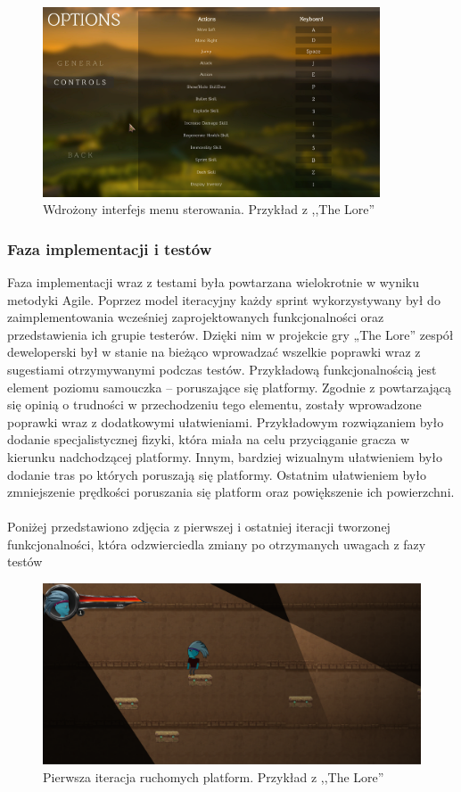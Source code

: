 \documentclass[oneside,polski,logo]{amuthesis}
\begin{document}
\begin{figure}[h]
	\centering
	\includegraphics[width=10cm]{images/hyps/of2.png}
	\caption{Wdrożony interfejs menu sterowania. Przykład z ,,The Lore''}
\end{figure}

\subsubsection{Faza implementacji i testów}

Faza implementacji wraz z testami była powtarzana wielokrotnie w wyniku metodyki Agile. Poprzez model iteracyjny każdy sprint wykorzystywany był do zaimplementowania wcześniej zaprojektowanych funkcjonalności oraz przedstawienia ich grupie testerów. Dzięki nim w projekcie gry „The Lore” zespół deweloperski był w stanie na bieżąco wprowadzać wszelkie poprawki wraz z sugestiami otrzymywanymi podczas testów. Przykładową funkcjonalnością jest element poziomu samouczka – poruszające się platformy. Zgodnie z powtarzającą się opinią o trudności w przechodzeniu tego elementu, zostały wprowadzone poprawki wraz z dodatkowymi ułatwieniami. Przykładowym rozwiązaniem było dodanie specjalistycznej fizyki, która miała na celu przyciąganie gracza w kierunku nadchodzącej platformy. Innym, bardziej wizualnym ułatwieniem było dodanie tras po których poruszają się platformy. Ostatnim ułatwieniem było zmniejszenie prędkości poruszania się platform oraz powiększenie ich powierzchni. \\ \\ 
Poniżej przedstawiono zdjęcia z pierwszej i ostatniej iteracji tworzonej funkcjonalności, która odzwierciedla zmiany po otrzymanych uwagach z fazy testów\\

\begin{figure}[h]
	\centering
	\includegraphics[width=12cm]{images/hyps/platfBef.png}
	\caption{Pierwsza iteracja ruchomych platform. Przykład z ,,The Lore''}
\end{figure}
\end{document}
